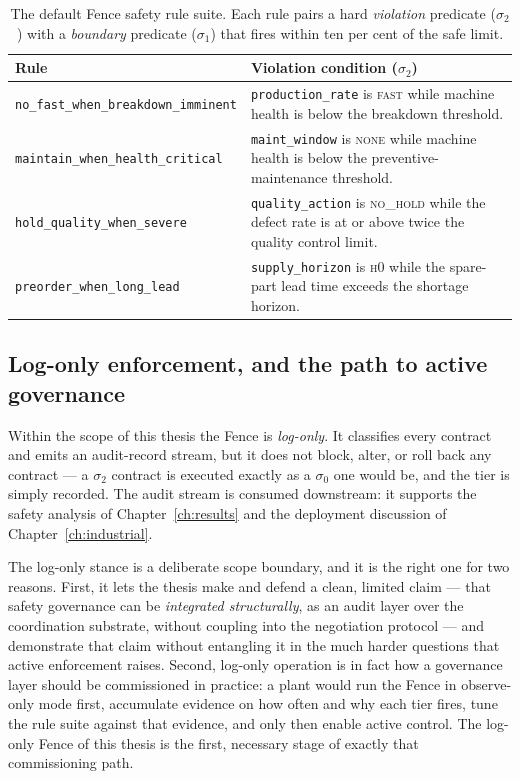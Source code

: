\begin{table}[ht]
\centering
\caption{The default Fence safety rule suite. Each rule pairs a hard
\emph{violation} predicate ($\sigma_2$) with a \emph{boundary}
predicate ($\sigma_1$) that fires within ten per cent of the safe
limit.}
\label{tab:fence-rules}
\small
\begin{tabularx}{\textwidth}{@{}l X@{}}
\toprule
\textbf{Rule} & \textbf{Violation condition ($\sigma_2$)} \\
\midrule
\texttt{no\_fast\_when\_break\-down\_imminent} &
  \texttt{production\_rate} is \textsc{fast} while machine health is
  below the breakdown threshold. \\
\addlinespace
\texttt{maintain\_when\_health\_critical} &
  \texttt{maint\_window} is \textsc{none} while machine health is below
  the preventive-maintenance threshold. \\
\addlinespace
\texttt{hold\_quality\_when\_severe} &
  \texttt{quality\_action} is \textsc{no\_hold} while the defect rate is
  at or above twice the quality control limit. \\
\addlinespace
\texttt{preorder\_when\_long\_lead} &
  \texttt{supply\_horizon} is \textsc{h0} while the spare-part lead time
  exceeds the shortage horizon. \\
\bottomrule
\end{tabularx}
\end{table}

\subsection{Log-only enforcement, and the path to active governance}
\label{subsec:fence-logonly}

Within the scope of this thesis the Fence is \emph{log-only}. It
classifies every contract and emits an audit-record stream, but it does
not block, alter, or roll back any contract --- a $\sigma_2$ contract is
executed exactly as a $\sigma_0$ one would be, and the tier is simply
recorded. The audit stream is consumed downstream: it supports the
safety analysis of Chapter~\ref{ch:results} and the deployment
discussion of Chapter~\ref{ch:industrial}.

The log-only stance is a deliberate scope boundary, and it is the right
one for two reasons. First, it lets the thesis make and defend a clean,
limited claim --- that safety governance can be \emph{integrated
structurally}, as an audit layer over the coordination substrate,
without coupling into the negotiation protocol --- and demonstrate that
claim without entangling it in the much harder questions that active
enforcement raises. Second, log-only operation is in fact how a
governance layer should be commissioned in practice: a plant would run
the Fence in observe-only mode first, accumulate evidence on how often
and why each tier fires, tune the rule suite against that evidence, and
only then enable active control. The log-only Fence of this thesis is
the first, necessary stage of exactly that commissioning path.

